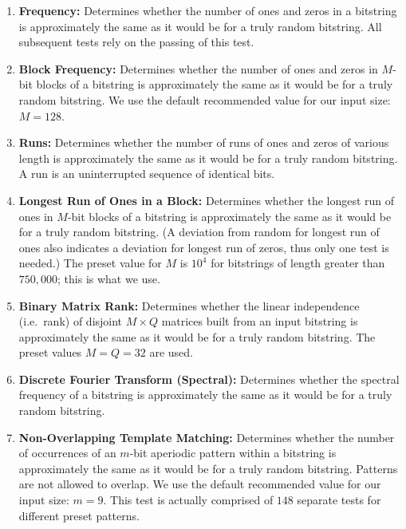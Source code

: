 \begin{enumerate}
\item \textbf{Frequency:} 
Determines whether the number of ones and zeros in a bitstring is approximately the same as it would be for a truly random bitstring.
All subsequent tests rely on the passing of this test.

\item \textbf{Block Frequency:} 
Determines whether the number of ones and zeros in $M$-bit blocks of a bitstring is approximately the same as it would be for a truly random bitstring.
We use the default recommended value for our input size: $M = 128$. 

\item \textbf{Runs:} 
Determines whether the number of runs of ones and zeros of various length is approximately the same as it would be for a truly random bitstring.
A run is an uninterrupted sequence of identical bits.

\item \textbf{Longest Run of Ones in a Block:} 
Determines whether the longest run of ones in $M$-bit blocks of a bitstring is approximately the same as it would be for a truly random bitstring.
(A deviation from random for longest run of ones also indicates a deviation for longest run of zeros, thus only one test is needed.)
The preset value for $M$ is $10^4$ for bitstrings of length greater than $750,000$; this is what we use.

\item \textbf{Binary Matrix Rank:} 
Determines whether the linear independence (i.e.\ rank) of disjoint $M \times Q$ matrices built from an input bitstring is approximately the same as it would be for a truly random bitstring.
The preset values $M = Q = 32$ are used.

\item \textbf{Discrete Fourier Transform (Spectral):} 
Determines whether the spectral frequency of a bitstring is approximately the same as it would be for a truly random bitstring.

\item \textbf{Non-Overlapping Template Matching:} 
Determines whether the number of occurrences of an $m$-bit aperiodic pattern within a bitstring is approximately the same as it would be for a truly random bitstring.
Patterns are not allowed to overlap.
We use the default recommended value for our input size: $m = 9$.
This test is actually comprised of $148$ separate tests for different preset patterns.


\end{enumerate}
